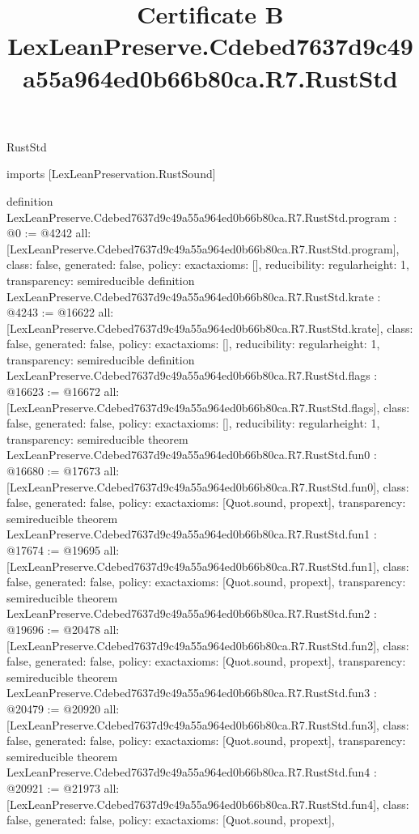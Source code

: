 \begin{lexlean}{RustStd}
\title{Certificate B LexLeanPreserve.Cdebed7637d9c49a55a964ed0b66b80ca.R7.RustStd}
\begin{coremodule}
imports [LexLeanPreservation.RustSound]

definition LexLeanPreserve.Cdebed7637d9c49a55a964ed0b66b80ca.R7.RustStd.program : @0 := @4242 {
  all: [LexLeanPreserve.Cdebed7637d9c49a55a964ed0b66b80ca.R7.RustStd.program],
  class: false,
  generated: false,
  policy: exact{axioms: []},
  reducibility: regular{height: 1},
  transparency: semireducible
}
definition LexLeanPreserve.Cdebed7637d9c49a55a964ed0b66b80ca.R7.RustStd.krate : @4243 := @16622 {
  all: [LexLeanPreserve.Cdebed7637d9c49a55a964ed0b66b80ca.R7.RustStd.krate],
  class: false,
  generated: false,
  policy: exact{axioms: []},
  reducibility: regular{height: 1},
  transparency: semireducible
}
definition LexLeanPreserve.Cdebed7637d9c49a55a964ed0b66b80ca.R7.RustStd.flags : @16623 := @16672 {
  all: [LexLeanPreserve.Cdebed7637d9c49a55a964ed0b66b80ca.R7.RustStd.flags],
  class: false,
  generated: false,
  policy: exact{axioms: []},
  reducibility: regular{height: 1},
  transparency: semireducible
}
theorem LexLeanPreserve.Cdebed7637d9c49a55a964ed0b66b80ca.R7.RustStd.fun0 : @16680 := @17673 {
  all: [LexLeanPreserve.Cdebed7637d9c49a55a964ed0b66b80ca.R7.RustStd.fun0],
  class: false,
  generated: false,
  policy: exact{axioms: [Quot.sound, propext]},
  transparency: semireducible
}
theorem LexLeanPreserve.Cdebed7637d9c49a55a964ed0b66b80ca.R7.RustStd.fun1 : @17674 := @19695 {
  all: [LexLeanPreserve.Cdebed7637d9c49a55a964ed0b66b80ca.R7.RustStd.fun1],
  class: false,
  generated: false,
  policy: exact{axioms: [Quot.sound, propext]},
  transparency: semireducible
}
theorem LexLeanPreserve.Cdebed7637d9c49a55a964ed0b66b80ca.R7.RustStd.fun2 : @19696 := @20478 {
  all: [LexLeanPreserve.Cdebed7637d9c49a55a964ed0b66b80ca.R7.RustStd.fun2],
  class: false,
  generated: false,
  policy: exact{axioms: [Quot.sound, propext]},
  transparency: semireducible
}
theorem LexLeanPreserve.Cdebed7637d9c49a55a964ed0b66b80ca.R7.RustStd.fun3 : @20479 := @20920 {
  all: [LexLeanPreserve.Cdebed7637d9c49a55a964ed0b66b80ca.R7.RustStd.fun3],
  class: false,
  generated: false,
  policy: exact{axioms: [Quot.sound, propext]},
  transparency: semireducible
}
theorem LexLeanPreserve.Cdebed7637d9c49a55a964ed0b66b80ca.R7.RustStd.fun4 : @20921 := @21973 {
  all: [LexLeanPreserve.Cdebed7637d9c49a55a964ed0b66b80ca.R7.RustStd.fun4],
  class: false,
  generated: false,
  policy: exact{axioms: [Quot.sound, propext]},
}
\end{coremodule}
\end{lexlean}
